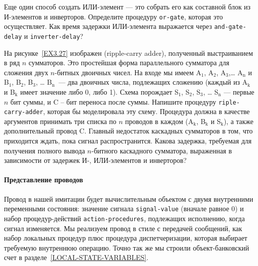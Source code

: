 \begin{exercise}{3.29}\label{EX3.29}%
 Еще один способ создать ИЛИ-элемент --- это собрать его
как составной блок из И-элементов и инверторов.  Определите процедуру
{\tt or-gate},
которая это осуществляет.  Как время
задержки ИЛИ-элемента выражается через {\tt and-gate-delay}
и {\tt inverter-delay}?
\end{exercise}
\begin{exercise}{3.30}\label{EX3.30}%
На рисунке~\ref{EX3.27} изображен
 (ripple-carry adder),
полученный выстраиванием в ряд
$n$ сумматоров.  Это простейшая форма параллельного
сумматора для сложения двух $n$-битных двоичных чисел.  На
входе мы имеем A${}_{\mbox{1}}$,
A${}_{\mbox{2}}$, A${}_{\mbox{3}}$,\ldots
A${}_{\mbox{n}}$ и B${}_{\mbox{1}}$,
B${}_{\mbox{2}}$, B${}_{\mbox{3}}$, \ldots
B${}_{\mbox{n}}$~--- два двоичных числа, подлежащих сложению
(каждый из A${}_{\mbox{k}}$ и B${}_{\mbox{k}}$ имеет
значение либо 0, либо 1).  Схема порождает S${}_{\mbox{1}}$,
S${}_{\mbox{2}}$, S${}_{\mbox{3}}$, \ldots
S${}_{\mbox{n}}$ --- первые $n$ бит суммы, и C
-- бит переноса после суммы.  Напишите процедуру
{\tt riple-carry-adder}, которая бы моделировала эту схему.
Процедура должна в качестве аргументов принимать три списка по
$n$ проводов в каждом (A${}_{\mbox{k}}$,
B${}_{\mbox{k}}$ и S${}_{\mbox{k}}$), а также
дополнительный провод C.  Главный недостаток каскадных сумматоров в
том, что приходится ждать, пока сигнал распространится.
Какова задержка, требуемая для получения полного вывода
$n$-битного каскадного сумматора, выраженная
в зависимости от задержек И-, ИЛИ-элементов и инверторов?
\end{exercise}

\paragraph{Представление проводов}


Провод в нашей имитации будет вычислительным объектом с
двумя внутренними переменными состояния: значение сигнала
{\tt signal-value} (вначале равное 0) и набор процедур-действий
{\tt action-procedures}, подлежащих исполнению, когда сигнал
изменяется.  Мы реализуем провод в стиле с
передачей сообщений, как
набор локальных процедур плюс процедура диспетчеризации,
которая выбирает требуемую внутреннюю операцию.  Точно так же мы
строили  объект-банковский счет в
разделе~\ref{LOCAL-STATE-VARIABLES}.

